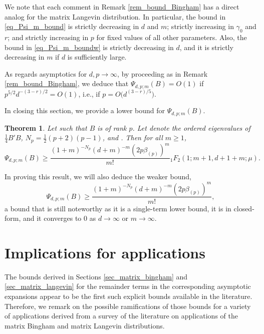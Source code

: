 \documentclass[pdftex]{sigma}
\numberwithin{equation}{section}
\newtheorem{Theorem}{Theorem}[section]
\def\R {\mathbb{R}}
\begin{document}
We note that each comment in Remark \ref{rem_bound_Bingham} has a direct analog for the matrix Langevin distribution. In particular, the bound in \eqref{eq_Psi_m_bound} is strictly decreasing in $d$ and $m$; strictly increasing in $\gamma_0$ and $r$; and strictly increasing in $p$ for fixed values of all other parameters. Also, the bound in \eqref{eq_Psi_m_boundw} is strictly decreasing in $d$, and it is strictly decreasing in $m$ if $d$ is sufficiently large.

As regards asymptotics for $d, p \to \infty$, by proceeding as in Remark \ref{rem_bound_Bingham}, we deduce that $\Psi_{d,p;m}(B) = O(1)$ if $p^{5/2} d^{-(3-r)/2} = O(1)$, i.e., if $p = O\bigl(d^{(3-r)/5}\bigr)$.

In closing this section, we provide a lower bound for $\Psi_{d,p;m}(B)$.

\begin{Theorem}
\label{thm_Psi_m_lower_bound_Langevin}
Let \smash{$B \in \R^{d \times p}$} such that $B$ is of rank $p$. Let  denote the ordered eigenvalues of $\tfrac14 B'B$, $N_p = \tfrac12(p+2)(p-1)$, and
.
Then for all $m \ge 1$,
\begin{equation}
\label{eq_Psi_m_lower_bound_Langevin}
\Psi_{d,p;m}(B) \ge \frac{(1+m)^{-N_p} (d+m)^{-m} (2p\beta_{(p)})^m}{m!} {}_1F_2(1;m+1,d+1+m;\mu).
\end{equation}
\end{Theorem}



In proving this result, we will also deduce the weaker bound,
\[
\Psi_{d,p;m}(B) \ge \frac{(1+m)^{-N_p} (d+m)^{-m} (2p\beta_{(p)})^m}{m!},
\]
a bound that is still noteworthy as it is a single-term lower bound, it is in closed-form, and it converges to $0$ as $d \to \infty$ or $m \to \infty$.


\section{Implications for applications}
\label{sec_implications}

The bounds derived in Sections \ref{sec_matrix_bingham} and \ref{sec_matrix_langevin} for the remainder terms in the corresponding asymptotic expansions appear to be the first such explicit bounds available in the literature. Therefore, we remark on the possible ramifications of those bounds for a variety of applications derived from a survey of the literature on applications of the matrix Bingham and matrix Langevin distributions.
\end{document}

